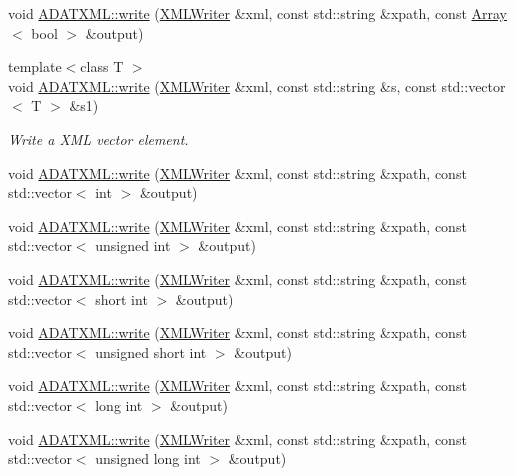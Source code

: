 \begin{DoxyCompactItemize}
void \mbox{\hyperlink{group__io_ga9a93f3084bfa9501e5fb5da53925c25d}{A\+D\+A\+T\+X\+M\+L\+::write}} (\mbox{\hyperlink{classADATXML_1_1XMLWriter}{X\+M\+L\+Writer}} \&xml, const std\+::string \&xpath, const \mbox{\hyperlink{classXMLArray_1_1Array}{Array}}$<$ bool $>$ \&output)
\item 
{\footnotesize template$<$class T $>$ }\\void \mbox{\hyperlink{group__io_gad6746caf2a4ff29e3ae8da748fd880a7}{A\+D\+A\+T\+X\+M\+L\+::write}} (\mbox{\hyperlink{classADATXML_1_1XMLWriter}{X\+M\+L\+Writer}} \&xml, const std\+::string \&s, const std\+::vector$<$ T $>$ \&s1)
\begin{DoxyCompactList}\small\item\em Write a X\+ML vector element. \end{DoxyCompactList}\item 
void \mbox{\hyperlink{group__io_ga5f73c76144fce7c12dd53d0f785b2d05}{A\+D\+A\+T\+X\+M\+L\+::write}} (\mbox{\hyperlink{classADATXML_1_1XMLWriter}{X\+M\+L\+Writer}} \&xml, const std\+::string \&xpath, const std\+::vector$<$ int $>$ \&output)
\item 
void \mbox{\hyperlink{group__io_ga763106f559ef609d54f89243e5965af4}{A\+D\+A\+T\+X\+M\+L\+::write}} (\mbox{\hyperlink{classADATXML_1_1XMLWriter}{X\+M\+L\+Writer}} \&xml, const std\+::string \&xpath, const std\+::vector$<$ unsigned int $>$ \&output)
\item 
void \mbox{\hyperlink{group__io_ga9085d80500322f8f56b37df7c27cd61a}{A\+D\+A\+T\+X\+M\+L\+::write}} (\mbox{\hyperlink{classADATXML_1_1XMLWriter}{X\+M\+L\+Writer}} \&xml, const std\+::string \&xpath, const std\+::vector$<$ short int $>$ \&output)
\item 
void \mbox{\hyperlink{group__io_gad9f57f8c23abf2a400ef501bb816e173}{A\+D\+A\+T\+X\+M\+L\+::write}} (\mbox{\hyperlink{classADATXML_1_1XMLWriter}{X\+M\+L\+Writer}} \&xml, const std\+::string \&xpath, const std\+::vector$<$ unsigned short int $>$ \&output)
\item 
void \mbox{\hyperlink{group__io_ga402db05a61329b7bfeb8e92021f669c6}{A\+D\+A\+T\+X\+M\+L\+::write}} (\mbox{\hyperlink{classADATXML_1_1XMLWriter}{X\+M\+L\+Writer}} \&xml, const std\+::string \&xpath, const std\+::vector$<$ long int $>$ \&output)
\item 
void \mbox{\hyperlink{group__io_gaddbbc6b8d1fa2d88b2b7d0ecd3e36884}{A\+D\+A\+T\+X\+M\+L\+::write}} (\mbox{\hyperlink{classADATXML_1_1XMLWriter}{X\+M\+L\+Writer}} \&xml, const std\+::string \&xpath, const std\+::vector$<$ unsigned long int $>$ \&output)

\end{DoxyCompactItemize}
